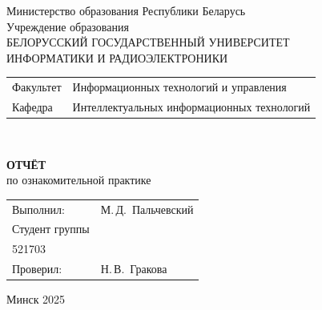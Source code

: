 \begin{titlepage}
  \begin{center}
    Министерство образования Республики Беларусь\\[1em]
    Учреждение образования\\
    БЕЛОРУССКИЙ ГОСУДАРСТВЕННЫЙ УНИВЕРСИТЕТ \\
    ИНФОРМАТИКИ И РАДИОЭЛЕКТРОНИКИ\\[1em]

    \begin{minipage}{\textwidth}
      \begin{flushleft}
        \begin{tabular}{ l l }
          Факультет & Информационных технологий и управления\\
          Кафедра   & Интеллектуальных информационных технологий
        \end{tabular}
      \end{flushleft}
    \end{minipage}\\[1em]

    \vspace{5em}


    \textbf{ОТЧЁТ}\\
    
    {по ознакомительной практике}\\
    \vspace{10em}
    
    \begin{tabular}{ p{}p{} }
      Выполнил:& М.\,Д.~Пальчевский \\[1em]
      Студент группы& \\
      521703 & \\
      Проверил: & Н.\,В.~Гракова \\

    \end{tabular}
    
    \vfill
    {\normalsize Минск 2025}
  \end{center}
\end{titlepage}
